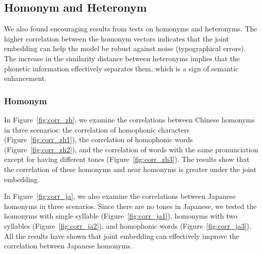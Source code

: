 \subsection{Homonym and Heteronym} \label{sec:analysis_homonym_heteronym}

We also found encouraging results from tests on homonyms and heteronyms. The higher correlation between the homonym vectors indicates that the joint embedding can help the model be robust against noise (typographical errors). The increase in the similarity distance between heteronyms implies that the phonetic information effectively separates them, which is a sign of semantic enhancement.

\subsubsection{Homonym}

In Figure~\ref{fig:corr_zh}, we examine the correlations between Chinese homonyms in three scenarios:
the correlation of homophonic characters (Figure~\ref{fig:corr_zh1}), the correlation of homophonic words (Figure~\ref{fig:corr_zh2}), and the correlation of words with the same pronunciation except for having different tones (Figure~\ref{fig:corr_zh3}).
The results show that the correlation of these homonyms and near homonyms is greater under the joint embedding.

In Figure~\ref{fig:corr_ja}, we also examine the correlations between Japanese homonyms in three scenarios. Since there are no tones in Japanese, we tested the homonyms with single syllable (Figure~\ref{fig:corr_ja1}), homonyms with two syllables (Figure~\ref{fig:corr_ja2}), and homophonic words (Figure~\ref{fig:corr_ja3}). All the results have shown that joint embedding can effectively improve the correlation between Japanese homonyms.

